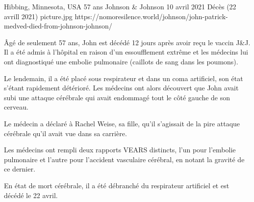 {Hibbing, Minnesota, USA}
{57 ans}
{Johnson \& Johnson}
{10 avril 2021}
{Décès (22 avrill 2021)}
{picture.jpg}
{https://nomoresilence.world/johnson/john-patrick-medved-died-from-johnson-johnson/}
{

Âgé de seulement 57 ans, John est décédé 12 jours après avoir reçu le vaccin
J\&J. Il a été admis à l'hôpital en raison d'un essoufflement extrême et les
médecins lui ont diagnostiqué une embolie pulmonaire (caillots de sang dans les
poumons).

Le lendemain, il a été placé sous respirateur et dans un coma artificiel, son
état s'étant rapidement détérioré. Les médecins ont alors découvert que John
avait subi une attaque cérébrale qui avait endommagé tout le côté gauche de son
cerveau.

Le médecin a déclaré à Rachel Weise, sa fille, qu'il s'agissait de la pire
attaque cérébrale qu'il avait vue dans sa carrière.

Les médecins ont rempli deux rapports VEARS distincts, l'un pour l'embolie
pulmonaire et l'autre pour l'accident vasculaire cérébral, en notant la gravité
de ce dernier.

En état de mort cérébrale, il a été débranché du respirateur artificiel et est
décédé le 22 avril.

}
